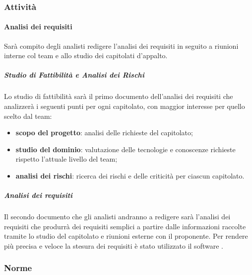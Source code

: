 \subsubsection{Attività}
		\paragraph{Analisi dei requisiti}
		Sarà compito degli analisti redigere l'analisi dei requisiti in seguito a riunioni interne col team e allo studio dei capitolati d'appalto.
			\subparagraph{Studio di Fattibilità e Analisi dei Rischi}
			Lo studio di fattibilità sarà il primo documento dell'analisi dei requisiti che analizzerà i seguenti punti per ogni capitolato, con maggior interesse per quello scelto dal team:
			\begin{itemize}
				\item \textbf{scopo del progetto}: analisi delle richieste del capitolato;
				\item \textbf{studio del dominio}: valutazione delle tecnologie e conoscenze richieste rispetto l'attuale livello del team;
				\item \textbf{analisi dei rischi}: ricerca dei rischi e delle criticità per ciascun capitolato.
			\end{itemize}
			\subparagraph{Analisi dei requisiti}
			Il secondo documento che gli analisti andranno a redigere sarà l'analisi dei requisiti che produrrà dei requisiti semplici a partire dalle informazioni raccolte tramite lo studio del capitolato e riunioni esterne con il proponente.
			Per rendere più precisa e veloce la stesura dei requisiti è stato utilizzato il software .
	\subsubsection{Norme}
